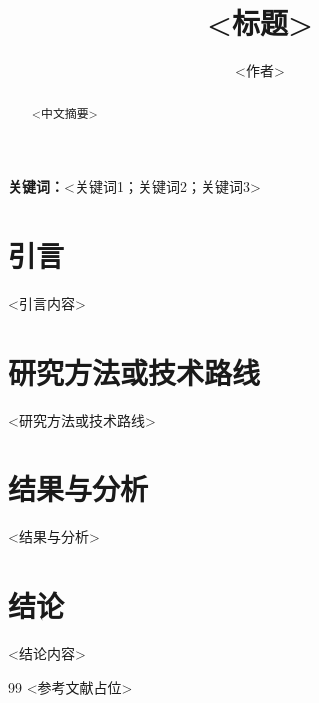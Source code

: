 \documentclass[UTF8]{ctexart}
\title{<标题>}
\author{<作者>}
\date{}
\begin{document}
\maketitle

\begin{abstract}
<中文摘要>
\end{abstract}

\textbf{关键词：}<关键词1；关键词2；关键词3>

\section{引言}
<引言内容>

\section{研究方法或技术路线}
<研究方法或技术路线>

\section{结果与分析}
<结果与分析>

\section{结论}
<结论内容>

\begin{thebibliography}{99}
 <参考文献占位>
\end{thebibliography}
\end{document}
